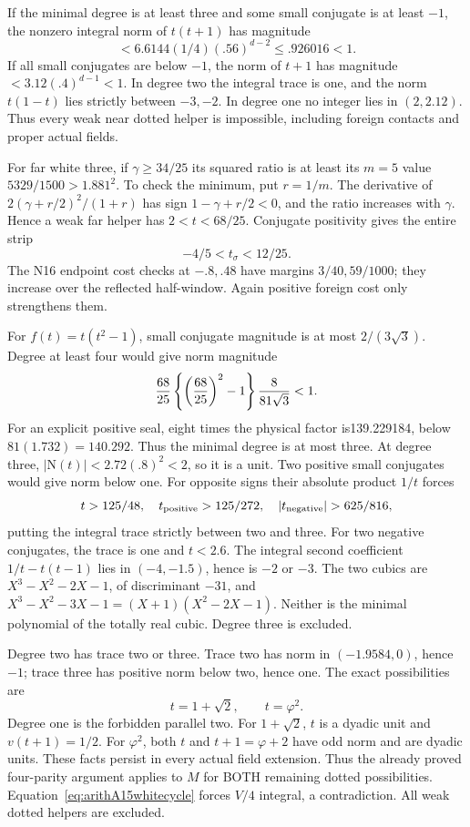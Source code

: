 \documentclass[11pt]{article}
\begin{document}
If the minimal degree is at least three and some small conjugate
is at least \(-1\), the nonzero integral norm of \(t(t+1)\)
has magnitude
\[
              <6.6144(1/4)(.56)^{d-2}\le.926016<1 .
\]
If all small conjugates are below \(-1\), the norm of \(t+1\)
has magnitude \(<3.12(.4)^{d-1}<1\).
In degree two the integral trace is one, and the norm
\(t(1-t)\) lies strictly between \(-3,-2\).
In degree one no integer lies in \((2,2.12)\).
Thus every weak near dotted helper is impossible, including
foreign contacts and proper actual fields.

For far white three, if \(\gamma\ge34/25\) its squared ratio
is at least its \(m=5\) value \(5329/1500>1.881^2\).
To check the minimum, put \(r=1/m\).
The derivative of \(2(\gamma+r/2)^2/(1+r)\) has sign
\(1-\gamma+r/2<0\), and the ratio increases with \(\gamma\).
Hence a weak far helper has \(2<t<68/25\).
Conjugate positivity gives the entire strip
\[
                            -4/5<t_\sigma<12/25 .
\]
The N16 endpoint cost checks at \(-.8,.48\) have margins
\(3/40,59/1000\); they increase over the reflected half-window.
Again positive foreign cost only strengthens them.

For \(f(t)=t(t^2-1)\), small conjugate magnitude is at most
\(2/(3\sqrt3)\).
Degree at least four would give norm magnitude
\[
 {68\over25}\left\{\left({68\over25}\right)^2-1\right\}
                         {8\over81\sqrt3}<1 .
\]
For an explicit positive seal, eight times the physical factor
is139.229184, below \(81(1.732)=140.292\).
Thus the minimal degree is at most three.
At degree three, \(|\mathrm N(t)|<2.72(.8)^2<2\), so it is
a unit.
Two positive small conjugates would give norm below one.
For opposite signs their absolute product \(1/t\) forces
\[
 t>125/48,\quad
 t_{\rm positive}>125/272,\quad
 |t_{\rm negative}|>625/816,
\]
putting the integral trace strictly between two and three.
For two negative conjugates, the trace is one and \(t<2.6\).
The integral second coefficient
\(1/t-t(t-1)\) lies in \((-4,-1.5)\), hence is \(-2\) or \(-3\).
The two cubics are
\(X^3-X^2-2X-1\), of discriminant \(-31\), and
\(X^3-X^2-3X-1=(X+1)(X^2-2X-1)\).
Neither is the minimal polynomial of the totally real cubic.
Degree three is excluded.

Degree two has trace two or three.
Trace two has norm in \((-1.9584,0)\), hence \(-1\);
trace three has positive norm below two, hence one.
The exact possibilities are
\[
                         t=1+\sqrt2,\qquad t=\varphi^2 .
\]
Degree one is the forbidden parallel two.
For \(1+\sqrt2\), \(t\) is a dyadic unit and
\(v(t+1)=1/2\).
For \(\varphi^2\), both \(t\) and \(t+1=\varphi+2\) have
odd norm and are dyadic units.
These facts persist in every actual field extension.
Thus the already proved four-parity argument applies to \(M\)
for BOTH remaining dotted possibilities.
Equation~\eqref{eq:arithA15whitecycle} forces \(V/4\) integral,
a contradiction.
All weak dotted helpers are excluded.
\end{document}
